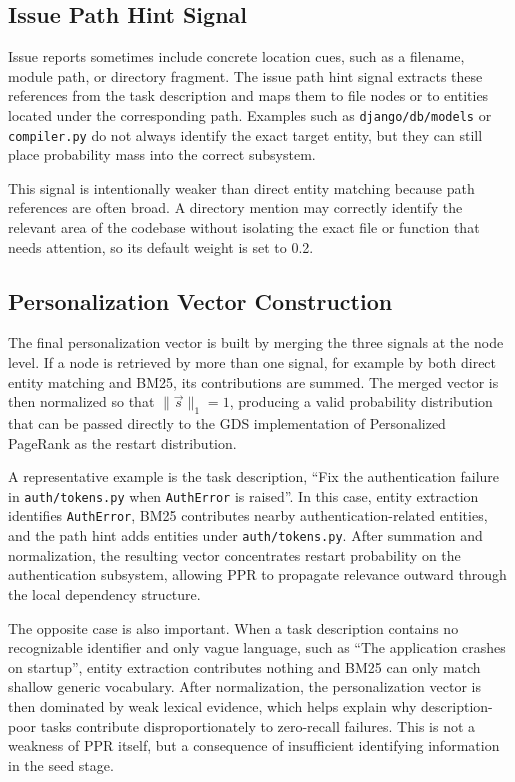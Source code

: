 \subsection{Issue Path Hint Signal}
\label{sec:issue-hint-signal}

Issue reports sometimes include concrete location cues, such as a filename, module path, or directory fragment. The issue path hint signal extracts these references from the task description and maps them to file nodes or to entities located under the corresponding path. Examples such as \texttt{django/db/models} or \texttt{compiler.py} do not always identify the exact target entity, but they can still place probability mass into the correct subsystem.

This signal is intentionally weaker than direct entity matching because path references are often broad. A directory mention may correctly identify the relevant area of the codebase without isolating the exact file or function that needs attention, so its default weight is set to 0.2.


\subsection{Personalization Vector Construction}
\label{sec:pvec-construction}

The final personalization vector is built by merging the three signals at the node level. If a node is retrieved by more than one signal, for example by both direct entity matching and BM25, its contributions are summed. The merged vector is then normalized so that $\|\vec{s}\|_1 = 1$, producing a valid probability distribution that can be passed directly to the GDS implementation of Personalized PageRank as the restart distribution.

A representative example is the task description, ``Fix the authentication failure in \texttt{auth/tokens.py} when \texttt{AuthError} is raised''. In this case, entity extraction identifies \texttt{AuthError}, BM25 contributes nearby authentication-related entities, and the path hint adds entities under \texttt{auth/tokens.py}. After summation and normalization, the resulting vector concentrates restart probability on the authentication subsystem, allowing PPR to propagate relevance outward through the local dependency structure.

The opposite case is also important. When a task description contains no recognizable identifier and only vague language, such as ``The application crashes on startup'', entity extraction contributes nothing and BM25 can only match shallow generic vocabulary. After normalization, the personalization vector is then dominated by weak lexical evidence, which helps explain why description-poor tasks contribute disproportionately to zero-recall failures. This is not a weakness of PPR itself, but a consequence of insufficient identifying information in the seed stage.

